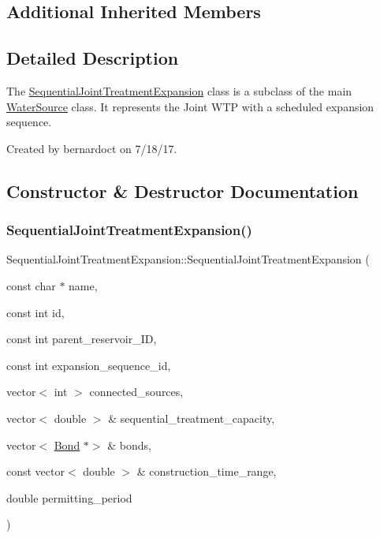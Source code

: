 \subsection*{Additional Inherited Members}


\subsection{Detailed Description}
The {\ttfamily \mbox{\hyperlink{classSequentialJointTreatmentExpansion}{Sequential\+Joint\+Treatment\+Expansion}}} class is a subclass of the main {\ttfamily \mbox{\hyperlink{classWaterSource}{Water\+Source}}} class. It represents the Joint W\+TP with a scheduled expansion sequence. 

Created by bernardoct on 7/18/17. 

\subsection{Constructor \& Destructor Documentation}
\mbox{\label{classSequentialJointTreatmentExpansion_ad3ca28eaaa041be6ebbd0a4593d5c9ab}} 
\subsubsection{\texorpdfstring{Sequential\+Joint\+Treatment\+Expansion()}{SequentialJointTreatmentExpansion()}\hspace{0.1cm}{\footnotesize\ttfamily [1/2]}}
{\footnotesize\ttfamily Sequential\+Joint\+Treatment\+Expansion\+::\+Sequential\+Joint\+Treatment\+Expansion (\begin{DoxyParamCaption}\item[{const char $\ast$}]{name,  }\item[{const int}]{id,  }\item[{const int}]{parent\+\_\+reservoir\+\_\+\+ID,  }\item[{const int}]{expansion\+\_\+sequence\+\_\+id,  }\item[{vector$<$ int $>$}]{connected\+\_\+sources,  }\item[{vector$<$ double $>$ \&}]{sequential\+\_\+treatment\+\_\+capacity,  }\item[{vector$<$ \mbox{\hyperlink{classBond}{Bond}} $\ast$$>$ \&}]{bonds,  }\item[{const vector$<$ double $>$ \&}]{construction\+\_\+time\+\_\+range,  }\item[{double}]{permitting\+\_\+period }\end{DoxyParamCaption})}



